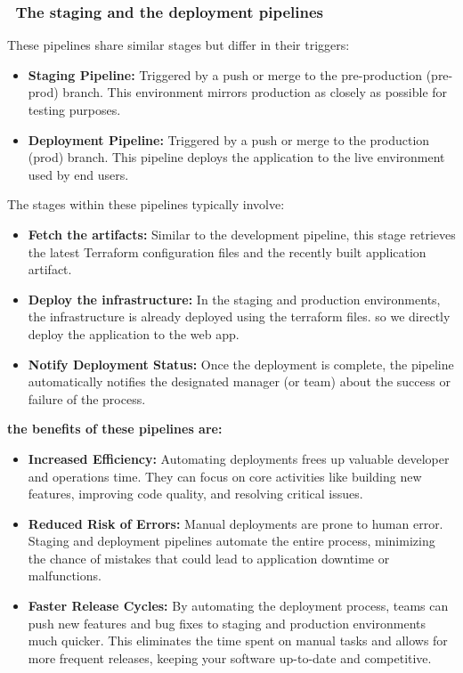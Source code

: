 \subsubsection*{ \textbullet\ The staging and the deployment pipelines}
\noindent These pipelines share similar stages but differ in their triggers:
\begin{itemize}
    \item \textbf{Staging Pipeline:} Triggered by a push or merge to the pre-production (pre-prod) branch. This environment mirrors production as closely as possible for testing purposes.
    \item \textbf{Deployment Pipeline:} Triggered by a push or merge to the production (prod) branch. This pipeline deploys the application to the live environment used by end users.
\end{itemize}
\noindent The stages within these pipelines typically involve:
\begin{itemize}
    \item \textbf{Fetch the artifacts:} Similar to the development pipeline, this stage retrieves the latest Terraform configuration files and the recently built application artifact.
    \item \textbf{Deploy the infrastructure:} In the staging and production environments, the infrastructure is already deployed using the terraform files. so we directly deploy the application to the web app.
    \item \textbf{Notify Deployment Status:} Once the deployment is complete, the pipeline automatically notifies the designated manager (or team) about the success or failure of the process.
\end{itemize}
\textbf{the benefits of these pipelines are:}
\begin{itemize}
    \item \textbf{Increased Efficiency:} Automating deployments frees up valuable developer and operations time. They can focus on core activities like building new features, improving code quality, and resolving critical issues.
    \item \textbf{Reduced Risk of Errors:} Manual deployments are prone to human error. Staging and deployment pipelines automate the entire process, minimizing the chance of mistakes that could lead to application downtime or malfunctions.
    \item \textbf{Faster Release Cycles:} By automating the deployment process, teams can push new features and bug fixes to staging and production environments much quicker. This eliminates the time spent on manual tasks and allows for more frequent releases, keeping your software up-to-date and competitive.
\end{itemize}
